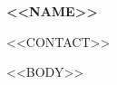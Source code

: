 \documentclass[10pt,letterpaper]{article}
\newcommand{\cpname}[1]{{\color{cpaccent}\Huge\bfseries #1\par}\vspace{3pt}}
\newcommand{\cpcontact}[1]{{\small #1\par}\vspace{3pt}}
\begin{document}
\cpname{<<NAME>>}
\cpcontact{<<CONTACT>>}
<<BODY>>
\end{document}
